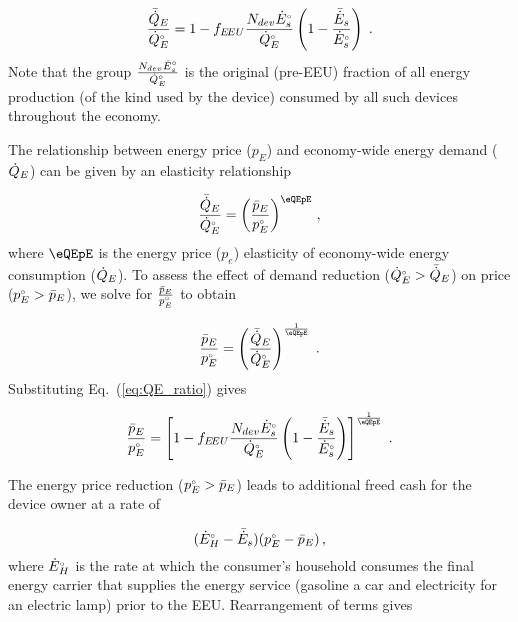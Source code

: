 \begin{equation} \label{eq:QE_ratio}
  \frac{\bar{\dot{Q}}_E}{{}{\dot{Q}}^{\scriptscriptstyle \circ}_E} =
        1 - f_{E\!EU} \frac{N_{dev} {}{\dot{E}}^{\scriptscriptstyle \circ}_s}{{}{\dot{Q}}^{\scriptscriptstyle \circ}_E} \left( 1 - \frac{\bar{\dot{E}}_s}{{}{\dot{E}}^{\scriptscriptstyle \circ}_s}  \right) \; .
\end{equation}
%
Note that the group $\frac{N_{dev} {}{\dot{E}}^{\scriptscriptstyle \circ}_s}{{}{\dot{Q}}^{\scriptscriptstyle \circ}_E}$
is the original (pre-EEU) fraction of all energy production
(of the kind used by the device)
consumed by all such devices throughout the economy.

The relationship between energy price ($p_E$) and
economy-wide energy demand ($\dot{Q}_E$)
can be given by an elasticity relationship

\begin{equation}
  \frac{\rainc{Q}_E}{\rorig{Q}_E} = 
          \left( \frac{\ainc{p}_E}{\orig{p}_E} \right)^{\eQEpE} \, ,
\end{equation}
%
where $\eQEpE$ is the energy price ($p_e$) elasticity
of economy-wide energy consumption ($\dot{Q}_E$).
To assess the effect of demand reduction
(${}{\dot{Q}}^{\scriptscriptstyle \circ}_E > \bar{\dot{Q}}_E$)
on price
(${}{p}^{\scriptscriptstyle \circ}_E > \bar{p}_E$),
we solve for $\frac{\bar{p}_E}{{}{p}^{\scriptscriptstyle \circ}_E}$
to obtain

\begin{equation}
  \frac{\ainc{p}_E}{\orig{p}_E} =
        \left( \frac{\rainc{Q}_E}{\rorig{Q}_E} \right)^{\frac{1}{\eQEpE}} \; .
\end{equation}
%
Substituting Eq.~(\ref{eq:QE_ratio}) gives

\begin{equation} \label{eq:price_effect_price_ratio}
  \frac{\ainc{p}_E}{\orig{p}_E} =
        \left[ 1 - f_{\EEU} \frac{N_{dev} \rbempl{E}_s}{\rbempl{Q}_E} \left( 1 - \frac{\rainc{E}_s}{\rbempl{E}_s}  \right) \right]^{\frac{1}{\eQEpE}} \; .
\end{equation}

The energy price reduction (${}{p}^{\scriptscriptstyle \circ}_E > \bar{p}_E$)
leads to additional freed cash for the device owner at a rate of

\begin{equation}
  ({}{\dot{E}}^{\scriptscriptstyle \circ}_H - \bar{\dot{E}}_s) ({}{p}^{\scriptscriptstyle \circ}_E - \bar{p}_E) \, ,
\end{equation}
%
where ${}{\dot{E}}^{\scriptscriptstyle \circ}_H$ is the rate at which the consumer's household 
consumes the final energy carrier that supplies
the energy service
(gasoline a car and
electricity for an electric lamp) 
prior to the EEU.
Rearrangement of terms gives

